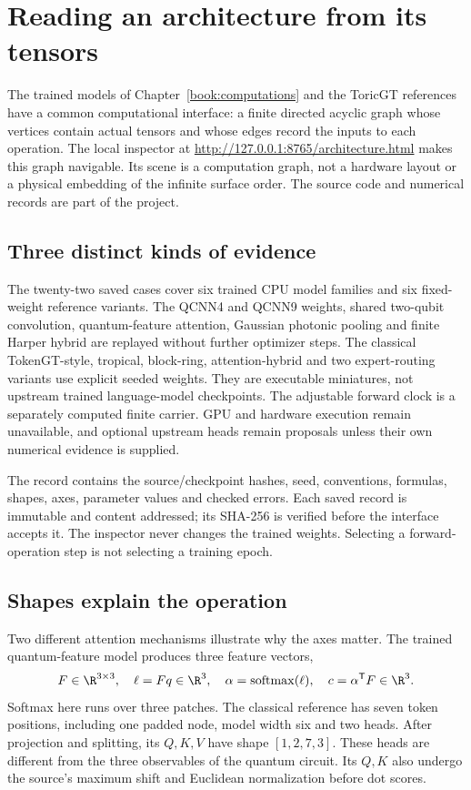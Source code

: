 \documentclass[11pt,oneside,openany]{book}
\theoremstyle{definition}\newtheorem{definition}[theorem]{Definition}
\theoremstyle{remark}\newtheorem{remark}[theorem]{Remark}
\begin{document}
\chapter{Reading an architecture from its tensors}
\label{book:architecture}
The trained models of Chapter~\ref{book:computations} and the ToricGT
references have a common computational interface: a finite directed acyclic
graph whose vertices contain actual tensors and whose edges record the
inputs to each operation. The local inspector at
\url{http://127.0.0.1:8765/architecture.html} makes this graph navigable.
Its scene is a computation graph, not a hardware layout or a physical
embedding of the infinite surface order. The source code and numerical
records are part of the project.

\section{Three distinct kinds of evidence}
The twenty-two saved cases cover six trained CPU model families and six
fixed-weight reference variants. The QCNN4 and QCNN9 weights, shared
two-qubit convolution, quantum-feature attention, Gaussian photonic pooling
and finite Harper hybrid are replayed without further optimizer steps.
The classical TokenGT-style, tropical, block-ring, attention-hybrid and two
expert-routing variants use explicit seeded weights. They are executable
miniatures, not upstream trained language-model checkpoints. The adjustable
forward clock is a separately computed finite carrier. GPU and hardware
execution remain unavailable, and optional upstream heads remain proposals
unless their own numerical evidence is supplied.

The record contains the source/checkpoint hashes, seed, conventions,
formulas, shapes, axes, parameter values and checked errors. Each saved
record is immutable and content addressed; its SHA-256 is verified before
the interface accepts it. The inspector never changes the trained weights.
Selecting a forward-operation step is not selecting a training epoch.

\section{Shapes explain the operation}
Two different attention mechanisms illustrate why the axes matter.
The trained quantum-feature model produces three feature vectors,
\[
 F\in\R^{3\times3},\quad \ell=Fq\in\R^3,\quad
 \alpha=\operatorname{softmax}(\ell),\quad c=\alpha^{\mathsf{T}}F\in\R^3.
\]
Softmax here runs over three patches. The classical reference has seven
token positions, including one padded node, model width six and two heads.
After projection and splitting, its $Q,K,V$ have shape
$[1,2,7,3]$. These heads are different from the three observables of the
quantum circuit. Its $Q,K$ also undergo the source's maximum shift and
Euclidean normalization before dot scores.
\end{document}
